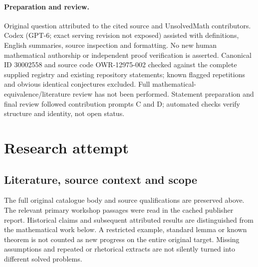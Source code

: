 \documentclass[11pt]{article}
\begin{document}
\paragraph{Preparation and review.}
Original question attributed to the cited source and UnsolvedMath contributors. Codex (GPT-6; exact serving revision not exposed) assisted with definitions, English summaries, source inspection and formatting. No new human mathematical authorship or independent proof verification is asserted. Canonical ID 30002558 and source code OWR-12975-002 checked against the complete supplied registry and existing repository statements; known flagged repetitions and obvious identical conjectures excluded. Full mathematical-equivalence/literature review has not been performed. Statement preparation and final review followed contribution prompts C and D; automated checks verify structure and identity, not open status.
\label{end:30002558}

\section{Research attempt}
\subsection{Literature, source context and scope}
The full original catalogue body and source qualifications are preserved above. The relevant primary workshop passages were read in the cached publisher report. Historical claims and subsequent attributed results are distinguished from the mathematical work below. A restricted example, standard lemma or known theorem is not counted as new progress on the entire original target. Missing assumptions and repeated or rhetorical extracts are not silently turned into different solved problems.
\end{document}
